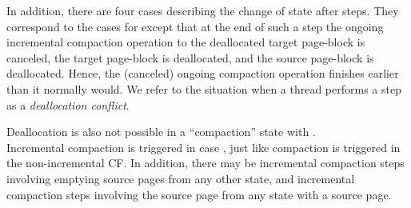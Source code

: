 \documentclass{amsart}
\begin{document}
In addition, there are four cases describing the change of state after
 steps.  They correspond to the cases for  except that at
the end of such a step the ongoing incremental compaction operation to
the deallocated target page-block is canceled, the target page-block is deallocated, and the source
page-block is deallocated. Hence, the (canceled) ongoing compaction
operation finishes earlier than it normally would. We refer to the
situation when a thread performs a  step as a
\emph{deallocation conflict}.

Deallocation is also not possible in a ``compaction'' state with .\\















Incremental compaction is triggered in case , just like
compaction is triggered in the non-incremental CF. In addition, there
may be incremental compaction steps involving emptying source pages
from any other state, and incremental compaction steps involving the
source page from any state with a source page.
\end{document}

